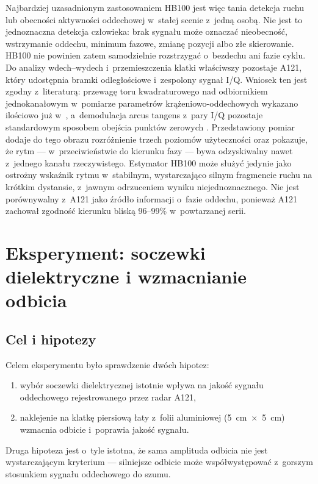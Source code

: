 \documentclass[12pt,a4paper,oneside]{report}
\begin{document}
Najbardziej uzasadnionym zastosowaniem HB100 jest więc tania detekcja ruchu
lub obecności aktywności oddechowej w~stałej scenie z~jedną osobą. Nie jest to
jednoznaczna detekcja człowieka: brak sygnału może oznaczać nieobecność,
wstrzymanie oddechu, minimum fazowe, zmianę pozycji albo złe skierowanie.
HB100 nie powinien zatem samodzielnie rozstrzygać o~bezdechu ani fazie cyklu.
Do analizy wdech--wydech i~przemieszczenia klatki właściwszy pozostaje A121,
który udostępnia bramki odległościowe i~zespolony sygnał I/Q. Wniosek ten jest
zgodny z~literaturą: przewagę toru kwadraturowego nad odbiornikiem
jednokanałowym w~pomiarze parametrów krążeniowo-oddechowych wykazano
ilościowo już w~\cite{droitcour2004}, a~demodulacja arcus tangens z~pary I/Q
pozostaje standardowym sposobem obejścia punktów zerowych \cite{park2007}.
Przedstawiony pomiar dodaje do tego obrazu rozróżnienie trzech poziomów
użyteczności oraz pokazuje, że rytm --- w~przeciwieństwie do kierunku fazy ---
bywa odzyskiwalny nawet z~jednego kanału rzeczywistego. Estymator HB100
może służyć jedynie jako ostrożny wskaźnik rytmu w~stabilnym, wystarczająco
silnym fragmencie ruchu na krótkim dystansie, z~jawnym odrzuceniem wyniku
niejednoznacznego. Nie jest porównywalny z~A121 jako źródło informacji
o~fazie oddechu, ponieważ A121 zachował zgodność kierunku bliską 96--99\%
w~powtarzanej serii.

\chapter{Eksperyment: soczewki dielektryczne i wzmacnianie odbicia}
\label{chap:soczewki}

\section{Cel i hipotezy}
Celem eksperymentu było sprawdzenie dwóch hipotez:
\begin{enumerate}
  \item wybór soczewki dielektrycznej istotnie wpływa na jakość sygnału
  oddechowego rejestrowanego przez radar A121,
  \item naklejenie na klatkę piersiową łaty z~folii aluminiowej
  (\SI{5}{cm}~$\times$~\SI{5}{cm}) wzmacnia odbicie i~poprawia jakość
  sygnału.
\end{enumerate}
Druga hipoteza jest o~tyle istotna, że sama amplituda odbicia nie jest
wystarczającym kryterium --- silniejsze odbicie może współwystępować
z~gorszym stosunkiem sygnału oddechowego do szumu.
\end{document}
